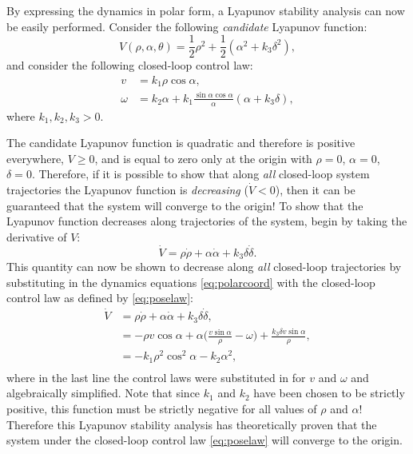 \begin{example}
By expressing the dynamics in polar form, a Lyapunov stability analysis can now be easily performed. Consider the following \textit{candidate} Lyapunov function:
\begin{equation}
V(\rho, \alpha, \theta) = \frac{1}{2} \rho^2 + \frac{1}{2} (\alpha^2 + k_3 \delta^2),
\end{equation}
and consider the following closed-loop control law:
\begin{equation} \label{eq:poselaw}
\begin{split}
v &= k_1 \rho \cos \alpha,
\\
\omega &= k_2 \alpha + k_1 \frac{\sin \alpha \cos \alpha}{\alpha}(\alpha + k_3 \delta),
\end{split}
\end{equation}
where $k_1, k_2, k_3>0$.

The candidate Lyapunov function is quadratic and therefore is positive everywhere, $V \geq 0$, and is equal to zero only at the origin with $\rho = 0$, $\alpha = 0$, $\delta=0$. Therefore, if it is possible to show that along \textit{all} closed-loop system trajectories the Lyapunov function is \textit{decreasing} ($\dot{V} < 0$), then it can be guaranteed that the system will converge to the origin! To show that the Lyapunov function decreases along trajectories of the system, begin by taking the derivative of $V$:
\begin{equation*}
\dot{V} = \rho \dot{\rho} + \alpha \dot{\alpha} + k_3 \delta \dot{\delta}.
\end{equation*}
This quantity can now be shown to decrease along \textit{all} closed-loop trajectories by substituting in the dynamics equations \eqref{eq:polarcoord} with the closed-loop control law as defined by \eqref{eq:poselaw}:
\begin{equation*}
\begin{split}
\dot{V} &= \rho \dot{\rho} + \alpha \dot{\alpha} + k_3 \delta \dot{\delta}, \\
&= - \rho v \cos\alpha + \alpha \big(\frac{v \sin\alpha}{\rho} - \omega \big) +  \frac{k_3 \delta v \sin \alpha}{\rho}, \\
&= -k_1 \rho^2 \cos^2 \alpha  - k_2 \alpha^2, \\
\end{split}
\end{equation*}
where in the last line the control laws were substituted in for $v$ and $\omega$ and algebraically simplified. Note that since $k_1$ and $k_2$ have been chosen to be strictly positive, this function must be strictly negative for all values of $\rho$ and $\alpha$! Therefore this Lyapunov stability analysis has theoretically proven that the system under the closed-loop control law \eqref{eq:poselaw} will converge to the origin.
\end{example}


